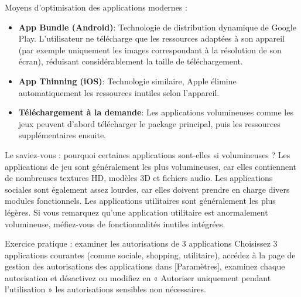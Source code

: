 Moyens d'optimisation des applications modernes :

\begin{itemize}
  \item \textbf{App Bundle (Android)}: Technologie de distribution dynamique de Google Play. L'utilisateur ne télécharge que les ressources adaptées à son appareil (par exemple uniquement les images correspondant à la résolution de son écran), réduisant considérablement la taille de téléchargement.
  \item \textbf{App Thinning (iOS)}: Technologie similaire, Apple élimine automatiquement les ressources inutiles selon l'appareil.
  \item \textbf{Téléchargement à la demande}: Les applications volumineuses comme les jeux peuvent d'abord télécharger le package principal, puis les ressources supplémentaires ensuite.
\end{itemize}

\begin{tcbinfo}{Le saviez-vous : pourquoi certaines applications sont-elles si volumineuses ?}
Les applications de jeu sont généralement les plus volumineuses, car elles contiennent de nombreuses textures HD, modèles 3D et fichiers audio. Les applications sociales sont également assez lourdes, car elles doivent prendre en charge divers modules fonctionnels. Les applications utilitaires sont généralement les plus légères. Si vous remarquez qu'une application utilitaire est anormalement volumineuse, méfiez-vous de fonctionnalités inutiles intégrées.

\end{tcbinfo}

\begin{tcbpractice}{Exercice pratique : examiner les autorisations de 3 applications}
Choisissez 3 applications courantes (comme sociale, shopping, utilitaire), accédez à la page de gestion des autorisations des applications dans [Paramètres], examinez chaque autorisation et désactivez ou modifiez en « Autoriser uniquement pendant l'utilisation » les autorisations sensibles non nécessaires.

\end{tcbpractice}
